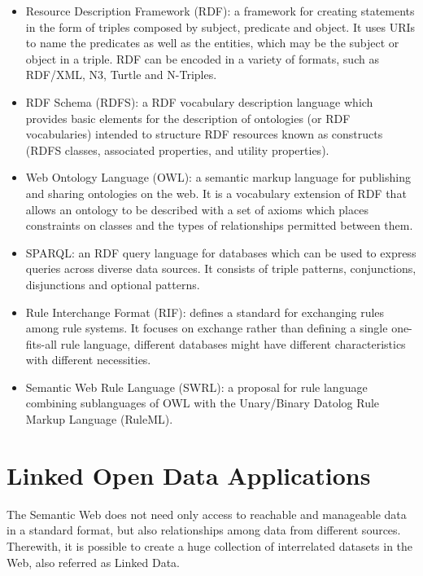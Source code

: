 \begin{itemize}
 \item Resource Description Framework (RDF): a framework for creating statements in the form of triples composed by
subject, predicate and object. It uses URIs to name the predicates as well as the entities, which may be the subject
or
object in a triple. RDF can be encoded in a variety of formats, such as RDF/XML, N3, Turtle and N-Triples.
 \item RDF Schema (RDFS): a RDF vocabulary description language which provides basic elements for the description of
ontologies (or RDF vocabularies) intended to structure RDF resources known as constructs (RDFS classes, associated
properties, and utility properties).
 \item Web Ontology Language (OWL): a semantic markup language for publishing and sharing ontologies on the web. It is
a
vocabulary extension of RDF that allows an ontology to be described with a set of axioms which places constraints on
classes and the types of relationships permitted between them.
 \item SPARQL: an RDF query language for databases which can be used to express queries across diverse data sources.
It
consists of triple patterns, conjunctions, disjunctions and optional patterns. 
 \item Rule Interchange Format (RIF): defines a standard for exchanging rules among rule systems. It focuses on
exchange rather than defining a single one-fits-all rule language, different databases might have different
characteristics with different necessities.
  \item Semantic Web Rule Language (SWRL): a proposal for rule language combining sublanguages of OWL with the
Unary/Binary Datolog Rule Markup Language (RuleML).
\end{itemize}

\section{Linked Open Data Applications}
\label{sec:rw-lod}

The Semantic Web does not need only access to reachable and manageable data in a standard format, but also
relationships among data from different sources. Therewith, it is possible to create a huge collection of interrelated
datasets in the Web, also referred as Linked Data.

